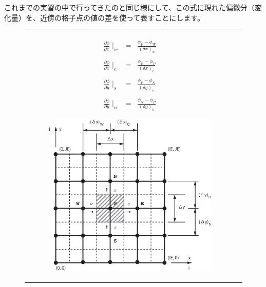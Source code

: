 \documentclass[uplatex,a4paper,11pt,oneside,openany]{jsbook}
\begin{document}
これまでの実習の中で行ってきたのと同じ様にして、この式に現れた偏微分（変化量）を、近傍の格子点の値の差を使って表すことにします。
\begin{figure}[H]
  \centering
  \begin{tabular}{lr}
      \begin{minipage}[t]{0.4\hsize}
        \begin{eqnarray*}
          \frac{\partial \phi}{\partial x}\mid_{w}&=&\frac{\phi_{P}-\phi_{W}}{(\delta x)_{w}} \\ \\
          \frac{\partial \phi}{\partial x}\mid_{e}&=&\frac{\phi_{E}-\phi_{P}}{(\delta x)_{e}} \\ \\
          \frac{\partial \phi}{\partial y}\mid_{s}&=&\frac{\phi_{P}-\phi_{S}}{(\delta y)_{s}} \\ \\
          \frac{\partial \phi}{\partial y}\mid_{n}&=&\frac{\phi_{N}-\phi_{P}}{(\delta y)_{n}}
        \end{eqnarray*} 
      \end{minipage}
      \begin{minipage}[t]{0.5\hsize}
        \begin{figure}[H]
  \includegraphics[clip,scale=0.45]{./figure/cvolume.eps}
        \end{figure}
      \end{minipage}
    \end{tabular}
\end{figure}%
\end{document}
